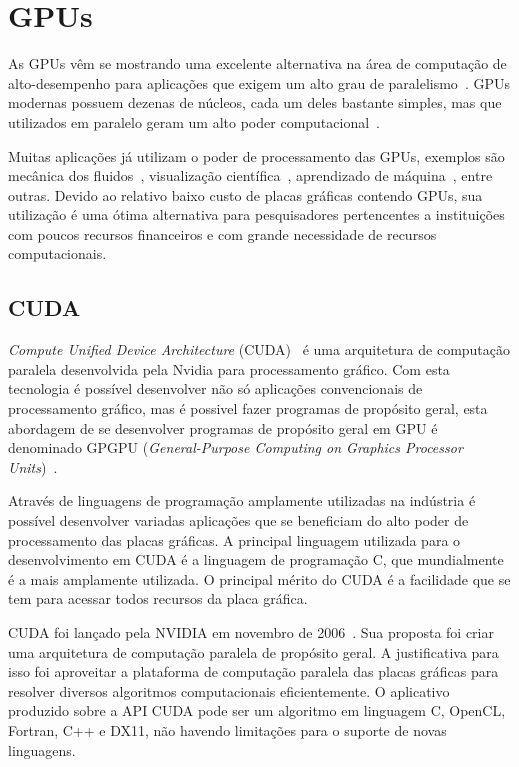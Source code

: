 \section{GPUs}\label{intro:historico}

As GPUs vêm se mostrando uma excelente alternativa na área de computação de alto-desempenho para aplicações que exigem um alto grau de paralelismo~\citep{gpu}. GPUs modernas possuem dezenas de núcleos, cada um deles bastante simples, mas que utilizados em paralelo geram um alto poder computacional~\citep{cuda}.

Muitas aplicações já utilizam o poder de processamento das GPUs, exemplos são mecânica dos fluidos~\citep{fluido}, visualização científica~\citep{visualizacao},  aprendizado de máquina~\citep{Aprendizado}, entre outras. Devido ao relativo baixo custo de placas gráficas contendo GPUs, sua utilização é uma ótima alternativa para pesquisadores pertencentes a instituições com poucos recursos financeiros e com grande necessidade de recursos computacionais.

\subsection{CUDA}

\textit{Compute Unified Device Architecture} (CUDA)~\citep{cuda} é uma arquitetura de computação paralela desenvolvida pela Nvidia para processamento gráfico.
Com esta tecnologia é possível desenvolver não só aplicações convencionais de processamento gráfico, mas é possivel fazer programas de propósito geral, esta abordagem de se desenvolver programas de propósito geral em GPU é denominado GPGPU (\textit{General-Purpose Computing on Graphics Processor Units})~\citep{GPGPU}.

Através de linguagens de programação amplamente utilizadas na indústria é possível desenvolver variadas aplicações que se beneficiam do alto poder de processamento das placas gráficas. A principal linguagem utilizada para o desenvolvimento em CUDA é a linguagem de
programação C, que mundialmente é a mais amplamente utilizada. O principal mérito do CUDA é a facilidade que se tem para acessar todos recursos da placa gráfica.

CUDA foi lançado pela NVIDIA em novembro de 2006~\citep{cuda}. Sua proposta foi criar uma arquitetura de computação paralela de propósito geral. A justificativa para isso foi aproveitar a plataforma de computação paralela das placas gráficas para resolver diversos algoritmos
computacionais eficientemente. O aplicativo produzido sobre a API CUDA pode ser um algoritmo em linguagem C, OpenCL, Fortran, C++ e DX11, não havendo limitações para o suporte de novas linguagens. 

